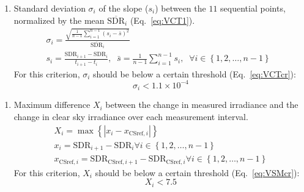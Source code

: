 \documentclass[
]{article}
\providecommand{\tightlist}{%
  \setlength{\itemsep}{0pt}\setlength{\parskip}{0pt}}
\begin{document}
\begin{enumerate}
\def\labelenumi{\alph{enumi})}
\setcounter{enumi}{3}
\tightlist
\item
  Standard deviation \(\sigma_i\) of the slope (\(s_i\)) between the \(11\) sequential points, normalized by the mean \(\overline{\text{SDR}}_i\) (Eq.~\ref{eq:VCT1}).
  \begin{gather}
    \sigma_i = \frac {\sqrt{\frac{1}{n-1} \sum_{i=1}^{n-1} \left( s_i - \bar{s} \right)^2}} {\overline{\text{SDR}}_i} \label{eq:VCT1} \\
    s_i = \frac{\text{SDR}_{i+1} - \text{SDR}_{i}}{t_{i+1} - t_i},\;\;   \bar{s} = \frac{1}{n-1} \sum_{i=1}^{n-1} s_i,\;\;\forall i \in \left \{ 1, 2, \ldots, n-1 \right \}\;\;
  \end{gather}
  For this criterion, \(\sigma_i\) should be below a certain threshold (Eq.~\ref{eq:VCTcr}):
  \begin{equation}
    \sigma_i < \ensuremath{1.1\times 10^{-4}} \label{eq:VCTcr}
  \end{equation}
\end{enumerate}

\begin{enumerate}
\def\labelenumi{\alph{enumi})}
\setcounter{enumi}{4}
\tightlist
\item
  Maximum difference \(X_i\) between the change in measured irradiance and the change in clear sky irradiance over each measurement interval.
  \begin{gather}
    X_i = \max{\left \{ \left | x_i - x_{\text{CSref},i} \right | \right \}} \label{eq:VSM3} \\
    x_i = \text{SDR}_{i+1} - \text{SDR}_{i} \forall i \in \left \{ 1, 2, \ldots, n-1 \right \} \label{eq:VSM1} \\
    x_{\text{CSref},i} = \text{SDR}_{\text{CSref},i+1} - \text{SDR}_{\text{CSref},i} \forall i \in \left \{ 1, 2, \ldots, n-1 \right \} \label{eq:VSM2}
  \end{gather}
  For this criterion, \(X_i\) should be below a certain threshold (Eq.~\ref{eq:VSMcr}):
  \begin{equation}
    X_i < 7.5 \label{eq:VSMcr}
  \end{equation}
\end{enumerate}
\end{document}
